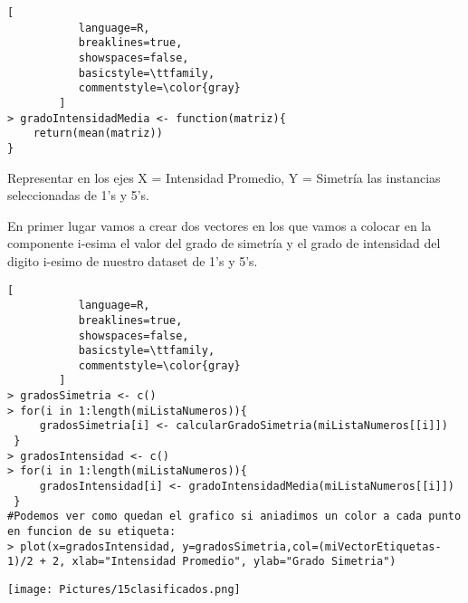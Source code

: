 \documentclass[11pt,fleqn]{book} %
\begin{document}
\begin{lstlisting}[
           language=R,
           breaklines=true,
           showspaces=false,
           basicstyle=\ttfamily,
           commentstyle=\color{gray}
        ]    
> gradoIntensidadMedia <- function(matriz){
    return(mean(matriz))
}   

\end{lstlisting}

\begin{exercise}
Representar en los ejes { X = Intensidad Promedio, Y = Simetría } las instancias seleccionadas de 1's y 5's.
\end{exercise}
En primer lugar vamos a crear dos vectores en los que vamos a colocar en la componente i-esima el valor del grado de simetría y el grado de intensidad del digito i-esimo de nuestro dataset de 1's y 5's.


\begin{lstlisting}[
           language=R,
           breaklines=true,
           showspaces=false,
           basicstyle=\ttfamily,
           commentstyle=\color{gray}
        ]    
> gradosSimetria <- c()
> for(i in 1:length(miListaNumeros)){
     gradosSimetria[i] <- calcularGradoSimetria(miListaNumeros[[i]])
 }
> gradosIntensidad <- c()
> for(i in 1:length(miListaNumeros)){
     gradosIntensidad[i] <- gradoIntensidadMedia(miListaNumeros[[i]])
 } 
#Podemos ver como quedan el grafico si aniadimos un color a cada punto en funcion de su etiqueta:
> plot(x=gradosIntensidad, y=gradosSimetria,col=(miVectorEtiquetas-1)/2 + 2, xlab="Intensidad Promedio", ylab="Grado Simetria")
\end{lstlisting}

\texttt{[image: Pictures/15clasificados.png]}
\end{document}

